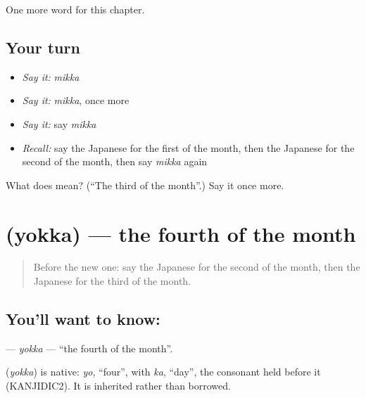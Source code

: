 \begin{grammarlens}[title={What you've built}]
One more word for this chapter.
\end{grammarlens}

\subsection*{Your turn}
\begin{itemize}
\raggedright
  \item \emph{Say it:} \emph{mikka}
  \item \emph{Say it:} \emph{mikka}, once more
  \item \emph{Say it:} say \emph{mikka}
  \item \emph{Recall:} say the Japanese for the first of the month, then the Japanese for the second of the month, then say \emph{mikka} again
\end{itemize}

\begin{tcolorbox}[breakable,colback=teal!4,colframe=teal!35!black,title={Before you move on}]
What does  mean? (\textquotedblleft{}The third of the month\textquotedblright{}.) Say it once more.
\end{tcolorbox}
\section[\texorpdfstring{\ja{よっか} (yokka)}{よっか (yokka)}]{ (yokka) — the fourth of the month}

\label{lesson:JA-C77-yokka}



\begin{quote}
Before the new one: say the Japanese for the second of the month, then the Japanese for the third of the month.
\end{quote}

\subsection*{You'll want to know: }
\textbf{} — \emph{yokka} — \textquotedblleft{}the fourth of the month\textquotedblright{}.

\begin{cousinweb}
\textbf{} (\emph{yokka}) is native: \emph{yo}, \textquotedblleft{}four\textquotedblright{}, with \emph{ka}, \textquotedblleft{}day\textquotedblright{}, the consonant held before it (KANJIDIC2). It is inherited rather than borrowed.
\end{cousinweb}

